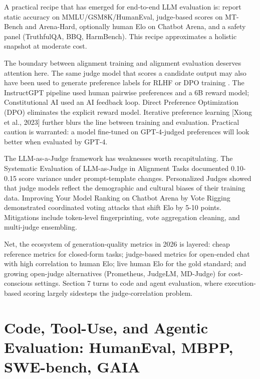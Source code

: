 \documentclass{article}
\begin{document}
A practical recipe that has emerged for end-to-end LLM evaluation is: report static accuracy on MMLU/GSM8K/HumanEval, judge-based scores on MT-Bench and Arena-Hard, optionally human Elo on Chatbot Arena, and a safety panel (TruthfulQA, BBQ, HarmBench). This recipe approximates a holistic snapshot at moderate cost.

The boundary between alignment training and alignment evaluation deserves attention here. The same judge model that scores a candidate output may also have been used to generate preference labels for RLHF or DPO training \cite{ouyang20222022,rafailov2023directpreferenceop}. The InstructGPT pipeline used human pairwise preferences and a 6B reward model; Constitutional AI \cite{bai20222022} used an AI feedback loop. Direct Preference Optimization (DPO) \cite{rafailov2023directpreferenceop} eliminates the explicit reward model. Iterative preference learning {[}Xiong et al., 2023{]} further blurs the line between training and evaluation. Practical caution is warranted: a model fine-tuned on GPT-4-judged preferences will look better when evaluated by GPT-4.

The LLM-as-a-Judge framework has weaknesses worth recapitulating. The Systematic Evaluation of LLM-as-Judge in Alignment Tasks \cite{wei20242024} documented 0.10-0.15 score variance under prompt-template changes. Personalized Judges \cite{dong2024canllmbeapersonali} showed that judge models reflect the demographic and cultural biases of their training data. Improving Your Model Ranking on Chatbot Arena by Vote Rigging \cite{min20252025} demonstrated coordinated voting attacks that shift Elo by 5-10 points. Mitigations include token-level fingerprinting, vote aggregation cleaning, and multi-judge ensembling.

Net, the ecosystem of generation-quality metrics in 2026 is layered: cheap reference metrics for closed-form tasks; judge-based metrics for open-ended chat with high correlation to human Elo; live human Elo for the gold standard; and growing open-judge alternatives (Prometheus, JudgeLM, MD-Judge) for cost-conscious settings. Section 7 turns to code and agent evaluation, where execution-based scoring largely sidesteps the judge-correlation problem.

\section{Code, Tool-Use, and Agentic Evaluation: HumanEval, MBPP, SWE-bench, GAIA}\label{code-tool-use-and-agentic-evaluation-humaneval-mbpp-swe-bench-gaia}
\end{document}
